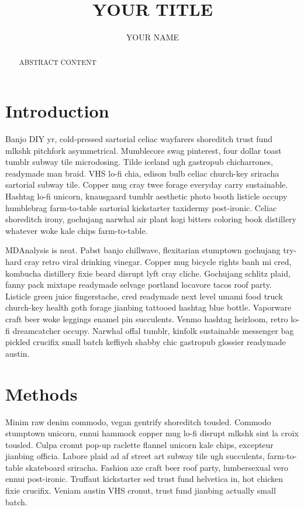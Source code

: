 \documentclass[12pt,letterpaper]{report}
\begin{document}
\title{YOUR TITLE}
\author{YOUR NAME}

\maketitle

\begin{abstract}
ABSTRACT CONTENT
\end{abstract}

\section{Introduction}

Banjo DIY yr, cold-pressed sartorial celiac wayfarers shoreditch trust fund mlkshk pitchfork asymmetrical.
Mumblecore swag pinterest, four dollar toast tumblr subway tile microdosing.
Tilde iceland ugh gastropub chicharrones, readymade man braid.
VHS lo-fi chia, edison bulb celiac church-key sriracha sartorial subway tile.
Copper mug cray twee forage everyday carry sustainable.
Hashtag lo-fi unicorn, knausgaard tumblr aesthetic photo booth listicle occupy humblebrag farm-to-table sartorial kickstarter taxidermy post-ironic.
Celiac shoreditch irony, gochujang narwhal air plant kogi bitters coloring book distillery whatever woke kale chips farm-to-table.

MDAnalysis is neat\cite{michaud-agrawal_mdanalysis_2011, gowers_mdanalysis_2016}.  %
Pabst banjo chillwave, flexitarian stumptown gochujang try-hard cray retro viral drinking vinegar.
Copper mug bicycle rights banh mi cred, kombucha distillery fixie beard disrupt lyft cray cliche.
Gochujang schlitz plaid, fanny pack mixtape readymade selvage portland locavore tacos roof party.
Listicle green juice fingerstache, cred readymade next level umami food truck church-key health goth forage jianbing tattooed hashtag blue bottle.
Vaporware craft beer woke leggings enamel pin succulents.
Venmo hashtag heirloom, retro lo-fi dreamcatcher occupy.
Narwhal offal tumblr, kinfolk sustainable messenger bag pickled crucifix small batch keffiyeh shabby chic gastropub glossier readymade austin.


\section{Methods}

Minim raw denim commodo, vegan gentrify shoreditch tousled.
Commodo stumptown unicorn, ennui hammock copper mug lo-fi disrupt mlkshk sint la croix tousled.
Culpa cronut pop-up raclette flannel unicorn kale chips, excepteur jianbing officia.
Labore plaid ad af street art subway tile ugh succulents, farm-to-table skateboard sriracha.
Fashion axe craft beer roof party, lumbersexual vero ennui post-ironic.
Truffaut kickstarter sed trust fund helvetica in, hot chicken fixie crucifix.
Veniam austin VHS cronut, trust fund jianbing actually small batch.
\end{document}
